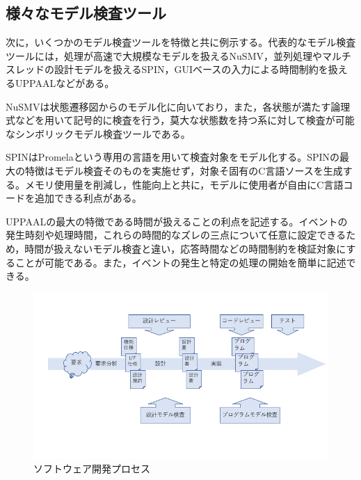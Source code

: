 \documentclass{tpu-sotu}
\begin{document}
	\subsection{様々なモデル検査ツール}
	次に，いくつかのモデル検査ツールを特徴と共に例示する。代表的なモデル検査ツールには，処理が高速で大規模なモデルを扱えるNuSMV，並列処理やマルチスレッドの設計モデルを扱えるSPIN，GUIベースの入力による時間制約を扱えるUPPAALなどがある。
	
	NuSMVは状態遷移図からのモデル化に向いており，また，各状態が満たす論理式などを用いて記号的に検査を行う，莫大な状態数を持つ系に対して検査が可能なシンボリックモデル検査ツールである。
	
	
	SPINはPromelaという専用の言語を用いて検査対象をモデル化する。SPINの最大の特徴はモデル検査そのものを実施せず，対象そ固有のC言語ソースを生成する。メモリ使用量を削減し，性能向上と共に，モデルに使用者が自由にC言語コードを追加できる利点がある。
	
	UPPAALの最大の特徴である時間が扱えることの利点を記述する。イベントの発生時刻や処理時間，これらの時間的なズレの三点について任意に設定できるため，時間が扱えないモデル検査と違い，応答時間などの時間制約を検証対象にすることが可能である。また，イベントの発生と特定の処理の開始を簡単に記述できる。
	\begin{figure}[htbp]
	\centering
	\includegraphics[width=160mm]{developmentProcess.png}
	\caption{ソフトウェア開発プロセス}
	\label{develP}
	\end{figure}
\end{document}
